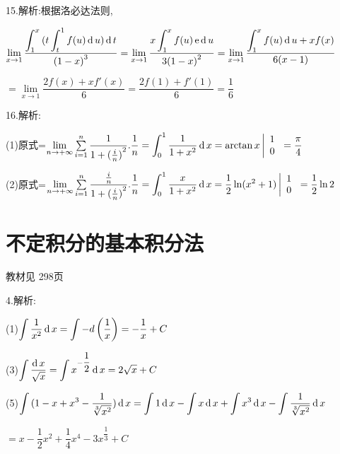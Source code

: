 15.解析:根据洛必达法则,

$\lim\limits_{x \to 1} \dfrac{{\displaystyle\int_1^x {(t\displaystyle\int_t^1 {f(u)\operatorname{\mathop{}\!\mathrm{d}} u)\operatorname{\mathop{}\!\mathrm{d}} t} } }}{{{{(1 - x)}^3}}}
= \lim\limits_{x \to 1} \dfrac{{x\displaystyle\int_1^x {f(u)\operatorname{\operatorname{e}} \operatorname{\mathop{}\!\mathrm{d}} u} }}{{3{{(1 - x)}^2}}}
= \lim\limits_{x \to 1} \dfrac{{\displaystyle\int_1^x {f(u)\operatorname{\mathop{}\!\mathrm{d}} u}  + xf(x)}}{{6(x - 1)}}$

$= \lim\limits_{x \to 1} \dfrac{{2f(x) + xf'(x)}}{6}
= \dfrac{{2f(1) + f'(1)}}{6}
= \dfrac{1}{6}$

16.解析:

(1)原式=$\lim\limits_{n \to +\infty} \sum\limits_{i = 1}^n {\dfrac{1}{{1 + {{(\frac{i}{n})}^2}}}} .\dfrac{1}{n} = \displaystyle\int_0^1 {\dfrac{1}{{1 + {x^2}}}} \rd x = \arctan x\left| {\begin{array}{*{20}{c}}
  1 \\
  0
\end{array}} \right. = \dfrac{\pi }{4}$

(2)原式=$\lim\limits_{n \to +\infty} \sum\limits_{i = 1}^n {\dfrac{{\frac{i}{n}}}{{1 + {{(\frac{i}{n})}^2}}}} .\dfrac{1}{n} = \displaystyle\int_0^1 {\dfrac{x}{{1 + {x^2}}}} \rd x = \dfrac{1}{2}\ln ({x^2} + 1)\left| {\begin{array}{*{20}{c}}
  1 \\
  0
\end{array}} \right. = \dfrac{1}{2}\ln 2$



\section{不定积分的基本积分法}
\begin{flushright}
  \color{zhanqing!80}
   教材见 298页 %
\end{flushright}

4.解析:

(1)$\displaystyle\int {\dfrac{1}{{{x^2}}}\operatorname{\mathop{}\!\mathrm{d}}x}  = \displaystyle\int { - d\left( {\dfrac{1}{x}} \right)}  =  - \dfrac{1}{x} + C$

(3)$\displaystyle\int {\dfrac{{\operatorname{\mathop{}\!\mathrm{d}}x}}{{\sqrt x }}}  = \displaystyle\int {{x^{ - \dfrac{1}{2}}}} \operatorname{\mathop{}\!\mathrm{d}} x = 2\sqrt x  + C$

(5)$\displaystyle\int {(1 - x + {x^3} - \dfrac{1}{{\sqrt[3]{{{x^2}}}}}} )\operatorname{\mathop{}\!\mathrm{d}} x = \displaystyle\int {1\operatorname{\mathop{}\!\mathrm{d}}x}  - \displaystyle\int {x\operatorname{\mathop{}\!\mathrm{d}}x + \displaystyle\int {{x^3}\operatorname{\mathop{}\!\mathrm{d}}x - \displaystyle\int {\dfrac{1}{{\sqrt[3]{{{x^2}}}}}\operatorname{\mathop{}\!\mathrm{d}}x} } } $

$ = x - \dfrac{1}{2}{x^2} + \dfrac{1}{4}{x^4} - 3{x^{\dfrac{1}{3}}} + C$

